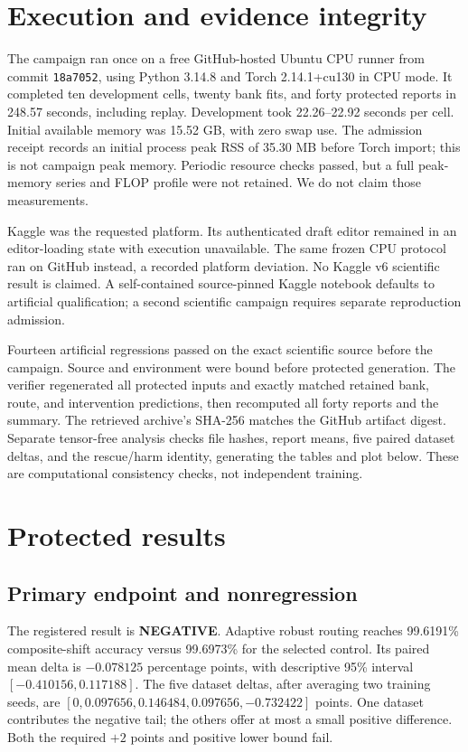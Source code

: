 \section{Execution and evidence integrity}
The campaign ran once on a free GitHub-hosted Ubuntu CPU runner from commit
\texttt{18a7052}, using Python 3.14.8 and Torch 2.14.1+cu130 in CPU mode. It
completed ten development cells, twenty bank fits, and forty protected reports
in 248.57 seconds, including replay. Development took 22.26--22.92 seconds per
cell. Initial available memory was 15.52 GB, with zero swap use. The admission
receipt records an initial process peak RSS of 35.30 MB before Torch import;
this is not campaign peak memory. Periodic resource checks passed, but a full
peak-memory series and FLOP profile were not retained. We do not claim those
measurements.

Kaggle was the requested platform. Its authenticated draft editor remained in
an editor-loading state with execution unavailable. The same frozen CPU
protocol ran on GitHub instead, a recorded platform deviation. No Kaggle v6
scientific result is claimed. A self-contained source-pinned Kaggle notebook
defaults to artificial qualification; a second scientific campaign requires
separate reproduction admission.

Fourteen artificial regressions passed on the exact scientific source before
the campaign. Source and environment were bound before protected generation.
The verifier regenerated all protected inputs and exactly matched retained
bank, route, and intervention predictions, then recomputed all forty reports
and the summary. The retrieved archive's SHA-256 matches the GitHub artifact
digest. Separate tensor-free analysis checks file hashes, report means, five
paired dataset deltas, and the rescue/harm identity, generating the tables and
plot below. These are computational consistency checks, not independent training.

\section{Protected results}
\subsection{Primary endpoint and nonregression}
The registered result is \textbf{NEGATIVE}. Adaptive robust routing reaches
99.6191\% composite-shift accuracy versus 99.6973\% for the selected control.
Its paired mean delta is $-0.078125$ percentage points, with descriptive 95\%
interval $[-0.410156,0.117188]$. The five dataset deltas, after averaging two
training seeds, are $[0,0.097656,0.146484,0.097656,-0.732422]$ points. One
dataset contributes the negative tail; the others offer at most a small
positive difference. Both the required $+2$ points and positive lower bound fail.

